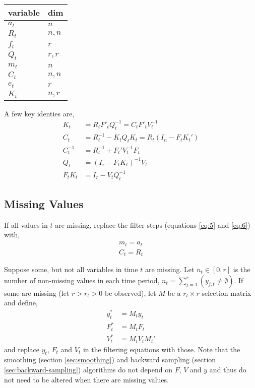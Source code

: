 \documentclass{article}\usepackage[]{graphicx}\usepackage[]{color}
\DeclareMathOperator{\E}{E}
\begin{document}
\begin{table}
  \centering
  \begin{tabular}[]{ll}
    \hline
    variable & dim \\
    \hline
    $a_{t}$ & $n$ \tabularnewline
    $R_{t}$ & $n, n$ \tabularnewline
    $f_{t}$ & $r$ \tabularnewline
    $Q_{t}$ & $r, r$ \tabularnewline
    $m_{t}$ & $n$ \tabularnewline
    $C_{t}$ & $n, n$ \tabularnewline
    $e_{t}$ & $r$ \tabularnewline
    $K_{t}$ & $n, r$ 
  \end{tabular}
  \label{Dimensions of variables in the filtering equations.}
\end{table}

A few key identies \parencite[106-107]{WestHarrison1997} are,
\begin{align}
  K_{t} &= R_{t} F'_{t} Q_{t}^{-1} = C_{t} F'_{t} V_{t}^{-1} \\
  C_{t} &= R_{t}^{-1} - K_{t} Q_{t} K_{t} = R_{t}(I_{n} - F_{t} K_{t}') \\
  C_{t}^{-1} &= R_{t}^{-1} + F_{t}' V_{t}^{-1} F_{t} \\
  Q_{t} &= (I_{r} - F_{t} K_{t})^{-1} V_{t} \\
  F_{t} K_{t} &= I_{r} - V_{t} Q_{t}^{-1}
\end{align}

\subsection{Missing Values}

If all values in $t$ are missing, replace the filter steps (equations \ref{eq:5} and \ref{eq:6}) with,
\begin{align}
  m_{t} = a_{t} \\
  C_{t} = R_{t} 
\end{align}

Suppose some, but not all variables in time $t$ are missing.
Let $n_{t} \in [0, r]$ is the number of non-missing values in each time period, $n_{t} = \sum_{j = 1}^{r} (y_{j,t} \neq \emptyset)$.
If some are missing (let $r > r_{t} > 0$ be observed), let $M$ be a $r_{t} \times r$ selection matrix and define,
\begin{align}
  y^{*}_{t} &= M_{t} y_{t} \\
  F^{*}_{t} &= M_{t} F_{t} \\
  V^{*}_{t} &= M_{t} V_{t} M_{t}'
\end{align}
and replace $y_{t}$, $F_{t}$ and $V_{t}$ in the filtering equations with those.
Note that the smoothing (section \ref{sec:smoothing}) and backward sampling (section \ref{sec:backward-sampling}) algorithms do not depend on $F$, $V$ and $y$ and thus do not need to be altered when there are missing values.
\end{document}
